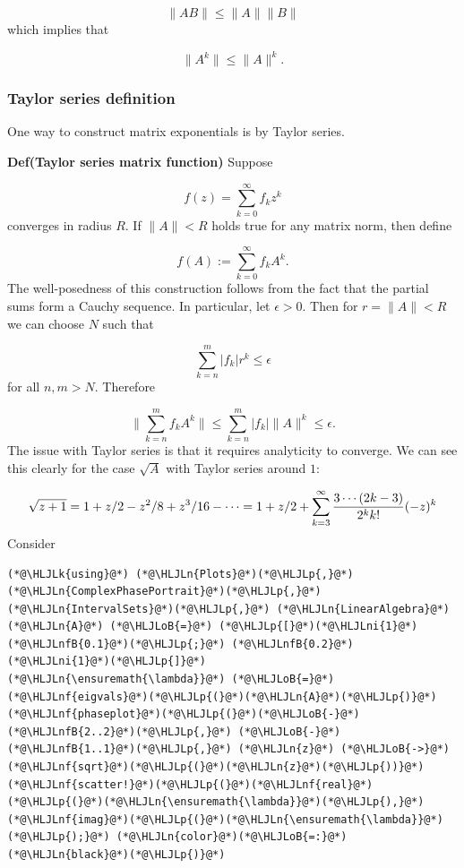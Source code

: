 \documentclass[12pt,a4paper]{article}
\newcommand{\HLJLk}[1]{\textcolor[RGB]{148,91,176}{\textbf{#1}}}
\newcommand{\HLJLn}[1]{#1}
\newcommand{\HLJLnf}[1]{\textcolor[RGB]{66,102,213}{#1}}
\newcommand{\HLJLnfB}[1]{\textcolor[RGB]{59,151,46}{#1}}
\newcommand{\HLJLni}[1]{\textcolor[RGB]{59,151,46}{#1}}
\newcommand{\HLJLoB}[1]{\textcolor[RGB]{102,102,102}{\textbf{#1}}}
\newcommand{\HLJLp}[1]{#1}
\begin{document}
\[
\|A B\| \leq \|A \| \|B \|
\]
which implies that

\[
\|A^k \| \leq \|A\|^k.
\]
\subsubsection{Taylor series definition}
One way to construct matrix exponentials is by Taylor series. 

\textbf{Def(Taylor series matrix function)} Suppose

\[
f(z) = \sum_{k=0}^\infty f_k z^k
\]
converges in radius $R$. If $\|A \| < R$ holds true for any matrix norm, then define

\[
f(A) := \sum_{k=0}^\infty f_k A^k.
\]
The well-posedness of this construction follows from the fact that the partial sums form a Cauchy sequence. In particular, let $\epsilon > 0$. Then for $r = \|A \| < R$ we can choose $N$ such that

\[
\sum_{k=n}^m |f_k| r^k \leq \epsilon
\]
for all $n,m > N$. Therefore

\[
\|\sum_{k=n}^m f_k A^k \| \leq \sum_{k=n}^m |f_k| \|A\|^k \leq \epsilon.
\]
The issue with Taylor series is that it requires analyticity to converge. We can see this clearly for the case  $\sqrt{A}$ with Taylor series around $1$:

\[
\sqrt{z+1} = 1 + z/2 - z^2/8 + z^3/16 - \cdots = 1 + z/2 + \sum_{k=3}^\infty {3 \cdots (2k-3) \over 2^k k!} (-z)^k
\]
Consider


\begin{lstlisting}
(*@\HLJLk{using}@*) (*@\HLJLn{Plots}@*)(*@\HLJLp{,}@*) (*@\HLJLn{ComplexPhasePortrait}@*)(*@\HLJLp{,}@*) (*@\HLJLn{IntervalSets}@*)(*@\HLJLp{,}@*) (*@\HLJLn{LinearAlgebra}@*)
(*@\HLJLn{A}@*) (*@\HLJLoB{=}@*) (*@\HLJLp{[}@*)(*@\HLJLni{1}@*) (*@\HLJLnfB{0.1}@*)(*@\HLJLp{;}@*) (*@\HLJLnfB{0.2}@*) (*@\HLJLni{1}@*)(*@\HLJLp{]}@*)
(*@\HLJLn{\ensuremath{\lambda}}@*) (*@\HLJLoB{=}@*) (*@\HLJLnf{eigvals}@*)(*@\HLJLp{(}@*)(*@\HLJLn{A}@*)(*@\HLJLp{)}@*)
(*@\HLJLnf{phaseplot}@*)(*@\HLJLp{(}@*)(*@\HLJLoB{-}@*)(*@\HLJLnfB{2..2}@*)(*@\HLJLp{,}@*) (*@\HLJLoB{-}@*)(*@\HLJLnfB{1..1}@*)(*@\HLJLp{,}@*) (*@\HLJLn{z}@*) (*@\HLJLoB{->}@*) (*@\HLJLnf{sqrt}@*)(*@\HLJLp{(}@*)(*@\HLJLn{z}@*)(*@\HLJLp{))}@*)
(*@\HLJLnf{scatter!}@*)(*@\HLJLp{(}@*)(*@\HLJLnf{real}@*)(*@\HLJLp{(}@*)(*@\HLJLn{\ensuremath{\lambda}}@*)(*@\HLJLp{),}@*)(*@\HLJLnf{imag}@*)(*@\HLJLp{(}@*)(*@\HLJLn{\ensuremath{\lambda}}@*)(*@\HLJLp{);}@*) (*@\HLJLn{color}@*)(*@\HLJLoB{=:}@*)(*@\HLJLn{black}@*)(*@\HLJLp{)}@*)
\end{lstlisting}
\end{document}
